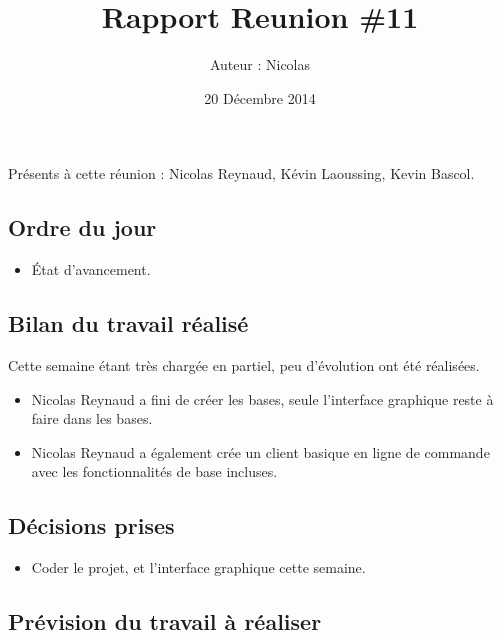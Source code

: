 \documentclass[12pt,a4paper]{article}
\title{Rapport Reunion \#11}
\author{Auteur : Nicolas \bsc{REYNAUD}}
\date{20 Décembre 2014}
\begin{document}
\maketitle

\newpage

Présents à cette réunion : Nicolas Reynaud, Kévin Laoussing, Kevin Bascol.

\subsection*{Ordre du jour}
\begin{itemize}[label = $\circledcirc$]
	\item État d'avancement.
\end{itemize}

\subsection*{Bilan du travail réalisé}
Cette semaine étant très chargée en partiel, peu d'évolution ont été réalisées.

\begin{itemize}[label = $\circledcirc$]
	\item Nicolas Reynaud a fini de créer les bases, seule l'interface graphique reste à faire dans les bases.
	\item Nicolas Reynaud a également crée un client basique en ligne de commande avec les fonctionnalités de base incluses.
\end{itemize}


\subsection*{Décisions prises}

\begin{itemize}[label = $\circledcirc$]
	\item Coder le projet, et l'interface graphique cette semaine.
\end{itemize}

\subsection*{Prévision du travail à réaliser}
\end{document}
